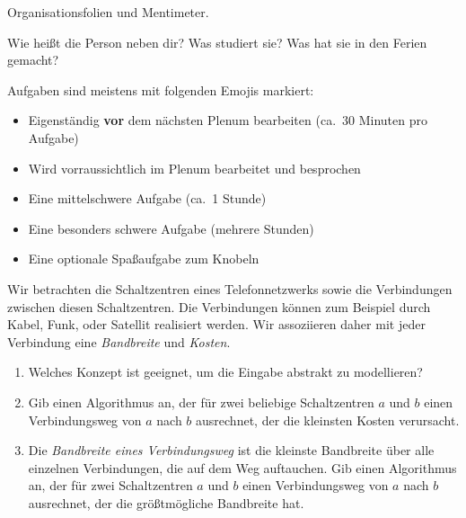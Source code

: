 \documentclass{uebung_cs}
\begin{document}
\begin{exercise}[Kennenlernen I][\atschool]
  Organisationsfolien und Mentimeter.
\end{exercise}

\begin{exercise}[Kennenlernen II][\atschool]
  Wie heißt die Person neben dir?
  Was studiert sie?
  Was hat sie in den Ferien gemacht?
\end{exercise}

\begin{exercise}
  Aufgaben sind meistens mit folgenden Emojis markiert:
  \begin{itemize}
    \item[\intro] Eigenständig \textbf{vor} dem nächsten Plenum bearbeiten (ca.~30 Minuten pro Aufgabe)
    \item[\atschool] Wird vorraussichtlich im Plenum bearbeitet und besprochen
    \item[\mittel] Eine mittelschwere Aufgabe (ca.~1 Stunde)
    \item[\note] Eine besonders schwere Aufgabe (mehrere Stunden)
    \item[\spass] Eine optionale Spaßaufgabe zum Knobeln
  \end{itemize}
\end{exercise}

\begin{exercise}[Telefonnetzwerk][\atschool\mittel]
  Wir betrachten die Schaltzentren eines Telefonnetzwerks sowie die Verbindungen zwischen diesen Schaltzentren.
  Die Verbindungen können zum Beispiel durch Kabel, Funk, oder Satellit realisiert werden.
  Wir assoziieren daher mit jeder Verbindung eine \emph{Bandbreite} und \emph{Kosten}.
  \begin{enumerate}
    \item Welches Konzept ist geeignet, um die Eingabe abstrakt zu modellieren?
    \item Gib einen Algorithmus an, der für zwei beliebige Schaltzentren $a$ und $b$ einen Verbindungsweg von $a$ nach $b$ ausrechnet, der die kleinsten Kosten verursacht.
    \item Die \emph{Bandbreite eines Verbindungsweg} ist die kleinste Bandbreite über alle einzelnen Verbindungen, die auf dem Weg auftauchen.
    Gib einen Algorithmus an, der für zwei Schaltzentren $a$ und $b$ einen Verbindungsweg von $a$ nach $b$ ausrechnet, der die größtmögliche Bandbreite hat.
  \end{enumerate}
\end{exercise}
\end{document}
